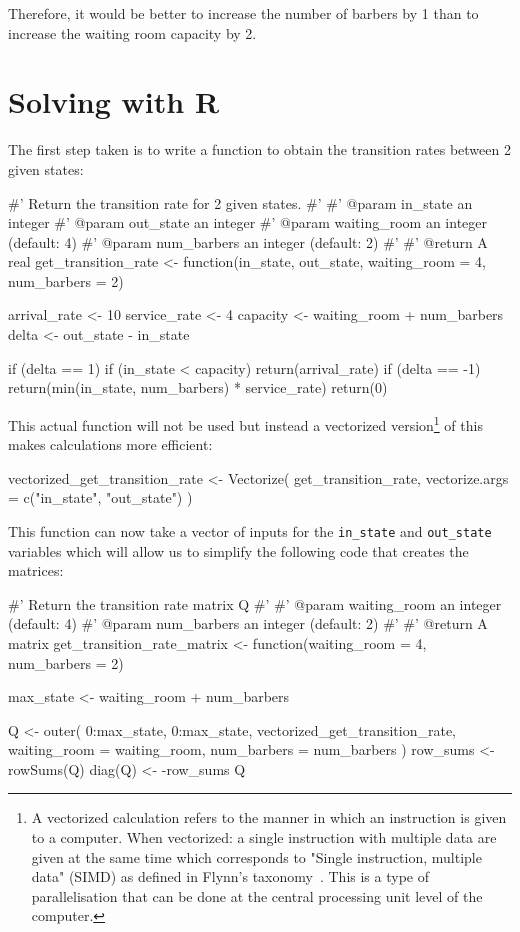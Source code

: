 Therefore, it would be better to increase the number of barbers by 1
than to increase the waiting room capacity by 2.

\section{Solving with R}\label{sec:markov_chains_solving-with-R}

The first step taken is to write a function to obtain the transition rates
between 2 given states:

\begin{Rin}
#' Return the transition rate for 2 given states.
#'
#' @param in_state an integer
#' @param out_state an integer
#' @param waiting_room an integer (default: 4)
#' @param num_barbers an integer  (default: 2)
#'
#' @return A real
get_transition_rate <- function(in_state,
                                out_state,
                                waiting_room = 4,
                                num_barbers = 2) {
  arrival_rate <- 10
  service_rate <- 4
  capacity <- waiting_room + num_barbers
  delta <- out_state - in_state

  if (delta == 1) {
    if (in_state < capacity) {
      return(arrival_rate)
    }
  }
  if (delta == -1) {
    return(min(in_state, num_barbers) * service_rate)
  }
  return(0)
}
\end{Rin}

This actual function will not be used but instead a vectorized
version\footnote{
A vectorized calculation refers to the manner in which an instruction is given
to a computer. When vectorized: a single instruction with multiple
data are given at the same time
which corresponds to "Single instruction, multiple data" (SIMD) as defined in
Flynn's taxonomy~\cite{flynn1966very}. This is a type of parallelisation
that can be done at the central processing unit level of the computer. }
of this
makes calculations more efficient:

\begin{Rin}
vectorized_get_transition_rate <- Vectorize(
  get_transition_rate,
  vectorize.args = c("in_state", "out_state")
)
\end{Rin}

This function can now take a vector of inputs for the \texttt{in_state}
and \texttt{out_state} variables which will allow us to simplify the
following code that creates the matrices:

\begin{Rin}
#' Return the transition rate matrix Q
#'
#' @param waiting_room an integer (default: 4)
#' @param num_barbers an integer (default: 2)
#'
#' @return A matrix
get_transition_rate_matrix <- function(waiting_room = 4,
                                       num_barbers = 2){
  max_state <- waiting_room + num_barbers

  Q <- outer(
    0:max_state,
    0:max_state,
    vectorized_get_transition_rate,
    waiting_room = waiting_room,
    num_barbers = num_barbers
  )
  row_sums <- rowSums(Q)
  diag(Q) <- -row_sums
  Q
}
\end{Rin}

